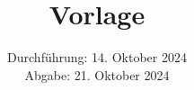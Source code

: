 

\subject{\texorpdfstring{\vspace{2ex}}{}V123\texorpdfstring{\vspace{-2ex}}{}} %
\title{Vorlage} %
\date{
	Durchführung: 14. Oktober 2024 %
	\\ Abgabe: 21. Oktober 2024 %
}





\maketitle
\thispagestyle{empty}


\tableofcontents
\newpage







\printbibliography{}

\newpage



